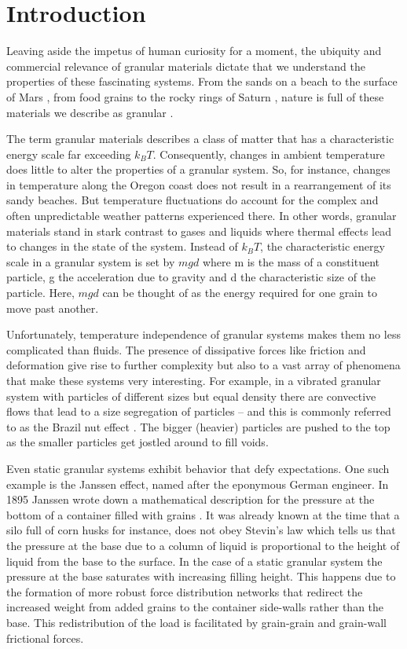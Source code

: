\chapter{Introduction}

Leaving aside the impetus of human curiosity for a moment, the ubiquity and commercial relevance of granular materials dictate that we understand the properties of these fascinating systems. From the sands on a beach \cite{schiffer_granular_2005} to the surface of Mars \cite{mars_and_moon}, from food grains to the rocky rings of Saturn \cite{brilliantov_size_2015, saturn_2017}, nature is full of these materials we describe as granular \cite{duran_sands_2000, jaeger_granular_1996}. 

The term granular materials describes a class of matter that has a characteristic energy scale far exceeding $k_{B}T$. Consequently, changes in ambient temperature does little to alter the properties of a granular system. So, for instance, changes in temperature along the Oregon coast does not result in a rearrangement of its sandy beaches. But temperature fluctuations do account for the complex and often unpredictable weather patterns experienced there. In other words, granular materials stand in stark contrast to gases and liquids where thermal effects lead to changes in the state of the system. Instead of $k_{B}T$, the characteristic energy scale in a granular system is set by $mgd$ where m is the mass of a constituent particle, g the acceleration due to gravity and d the characteristic size of the particle. Here, $mgd$ can be thought of as the energy required for one grain to move past another. 

Unfortunately, temperature independence of granular systems makes them no less complicated than fluids. The presence of dissipative forces like friction and deformation give rise to further complexity but also to a vast array of phenomena that make these systems very interesting. For example, in a vibrated granular system with particles of different sizes but equal density there are convective flows that lead to a size segregation of particles – and this is commonly referred to as the Brazil nut effect \cite{rosato, hong}. The bigger (heavier) particles are pushed to the top as the smaller particles get jostled around to fill voids. 

Even static granular systems exhibit behavior that defy expectations. One such example is the Janssen effect, named after the eponymous German engineer. In 1895 Janssen wrote down a mathematical description for the pressure at the bottom of a container filled with grains \cite{janssen_versuche_1895}. It was already known at the time that a silo full of corn husks for instance, does not obey Stevin's law which tells us that the pressure at the base due to a column of liquid is proportional to the height of liquid from the base to the surface. In the case of a static granular system the pressure at the base saturates with increasing filling height. This happens due to the formation of more robust force distribution networks that redirect the increased weight from added grains to the container side-walls rather than the base. This redistribution of the load is facilitated by grain-grain and grain-wall frictional forces. 

